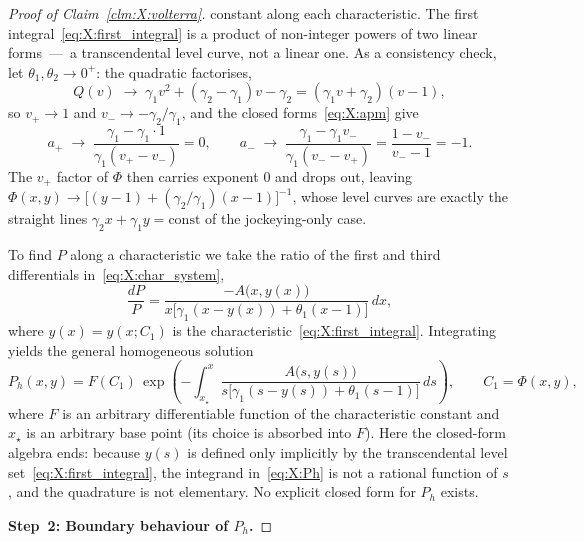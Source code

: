 \begin{proof}[Proof of Claim~\ref{clm:X:volterra}]
constant along each characteristic. The first integral~\eqref{eq:X:first_integral} is a
product of non-integer powers of two linear forms~---~a transcendental level curve, not
a linear one. As a consistency check, let $\theta_1,\theta_2\to0^+$: the quadratic
factorises,
\begin{equation}
    Q(v)\;\to\;\gamma_1 v^2+(\gamma_2-\gamma_1)v-\gamma_2
    =(\gamma_1 v+\gamma_2)(v-1),
    \nonumber
\end{equation}
so $v_+\to1$ and $v_-\to-\gamma_2/\gamma_1$, and the closed forms~\eqref{eq:X:apm} give
\begin{equation}
    a_+\;\to\;\frac{\gamma_1-\gamma_1\cdot 1}{\gamma_1(v_+-v_-)}=0,
    \qquad
    a_-\;\to\;\frac{\gamma_1-\gamma_1 v_-}{\gamma_1(v_--v_+)}
    =\frac{1-v_-}{v_--1}=-1 .
    \nonumber
\end{equation}
The $v_+$ factor of $\Phi$ then carries exponent $0$ and drops out, leaving
$\Phi(x,y)\to\bigl[(y-1)+(\gamma_2/\gamma_1)(x-1)\bigr]^{-1}$, whose level curves are
exactly the straight lines $\gamma_2 x+\gamma_1 y=\mathrm{const}$ of the jockeying-only
case.

To find $P$ along a characteristic we take the ratio of the first and third differentials
in~\eqref{eq:X:char_system},
\begin{equation*}
    \frac{dP}{P}
    = \frac{-A\bigl(x,y(x)\bigr)}
           {x\bigl[\gamma_1(x-y(x))+\theta_1(x-1)\bigr]}\,dx ,
\end{equation*}
where $y(x)=y(x;C_1)$ is the characteristic~\eqref{eq:X:first_integral}. Integrating
yields the general homogeneous solution
\begin{equation}
    P_h(x,y)
    = F(C_1)\,\exp\!\left(
        -\int_{x_\star}^{x}
        \frac{A\bigl(s,y(s)\bigr)}
             {s\bigl[\gamma_1(s-y(s))+\theta_1(s-1)\bigr]}\,ds
    \right),
    \qquad C_1=\Phi(x,y),
    \label{eq:X:Ph}
\end{equation}
where $F$ is an arbitrary differentiable function of the characteristic constant and
$x_\star$ is an arbitrary base point (its choice is absorbed into $F$). Here the
closed-form algebra ends: because $y(s)$ is defined only implicitly by the
transcendental level set~\eqref{eq:X:first_integral}, the integrand
in~\eqref{eq:X:Ph} is not a rational function of $s$, and the quadrature is not
elementary. No explicit closed form for $P_h$ exists.

\medskip\noindent\textbf{Step~2: Boundary behaviour of $P_h$.}


\end{proof}
